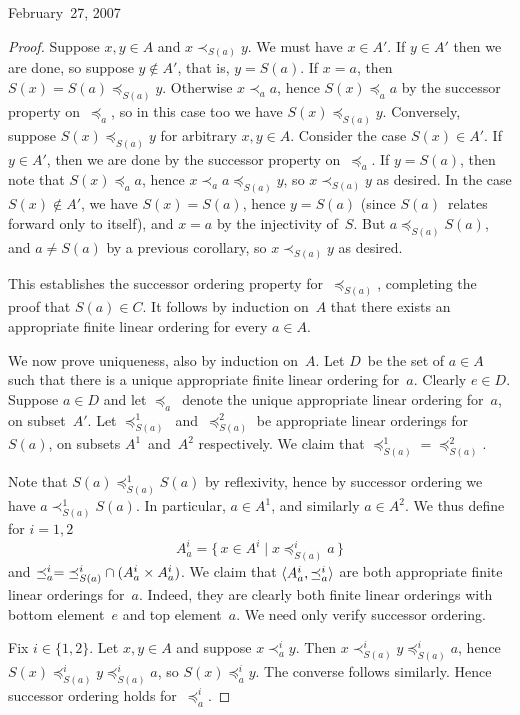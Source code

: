 \begin{lecture}{February~27, 2007}
\begin{proof}
Suppose \(x,y\in A\) and \(x\prec_{S(a)} y\). We must have \(x\in A'\). If \(y\in A'\) then we are done, so suppose \(y\not\in A'\), that is, \(y=S(a)\). If \(x=a\), then \(S(x)=S(a)\preceq_{S(a)} y\). Otherwise \(x\prec_a a\), hence \(S(x)\preceq_a a\) by the successor property on~\(\preceq_a\), so in this case too we have \(S(x)\preceq_{S(a)} y\). Conversely, suppose \(S(x)\preceq_{S(a)} y\) for arbitrary \(x,y\in A\). Consider the case \(S(x)\in A'\). If \(y\in A'\), then we are done by the successor property on~\(\preceq_a\). If \(y=S(a)\), then note that \(S(x)\preceq_a a\), hence \(x\prec_a a\preceq_{S(a)} y\), so \(x\prec_{S(a)} y\) as desired. In the case \(S(x)\not\in A'\), we have \(S(x)=S(a)\), hence \(y=S(a)\) (since \(S(a)\)~relates forward only to itself), and \(x=a\) by the injectivity of~\(S\). But \(a\preceq_{S(a)} S(a)\), and \(a\ne S(a)\) by a previous corollary, so \(x\prec_{S(a)} y\) as desired.

This establishes the successor ordering property for~\(\preceq_{S(a)}\), completing the proof that \(S(a)\in C\). It follows by induction on~\(A\) that there exists an appropriate finite linear ordering for every \(a\in A\).

We now prove uniqueness, also by induction on~\(A\). Let \(D\)~be the set of \(a\in A\) such that there is a unique appropriate finite linear ordering for~\(a\). Clearly \(e\in D\). Suppose \(a\in D\) and let \(\preceq_a\)~denote the unique appropriate linear ordering for~\(a\), on subset~\(A'\). Let \(\preceq_{S(a)}^1\)~and~\(\preceq_{S(a)}^2\) be appropriate linear orderings for~\(S(a)\), on subsets \(A^1\)~and~\(A^2\) respectively. We claim that \({\preceq_{S(a)}^1}={\preceq_{S(a)}^2}\).

Note that \(S(a)\preceq_{S(a)}^1 S(a)\) by reflexivity, hence by successor ordering we have \(a\prec_{S(a)}^1 S(a)\). In particular, \(a\in A^1\), and similarly \(a\in A^2\). We thus define for \(i=1,2\)
\[A_a^i=\{\,x\in A^i\mid x\preceq_{S(a)}^i a\,\}\]
and \(\preceq_a^i={\preceq_{S(a)}^i}\cap(A_a^i\times A_a^i)\). We claim that \(\langle{A_a^i},{\preceq_a^i}\rangle\) are both appropriate finite linear orderings for~\(a\). Indeed, they are clearly both finite linear orderings with bottom element~\(e\) and top element~\(a\). We need only verify successor ordering.

Fix \(i\in\{1,2\}\). Let \(x,y\in A\) and suppose \(x\prec_a^i y\). Then \(x\prec_{S(a)}^i y\preceq_{S(a)}^i a\), hence \(S(x)\preceq_{S(a)}^i y\preceq_{S(a)}^i a\), so \(S(x)\preceq_a^i y\). The converse follows similarly. Hence successor ordering holds for~\(\preceq_a^i\).


\end{proof}
\end{lecture}
